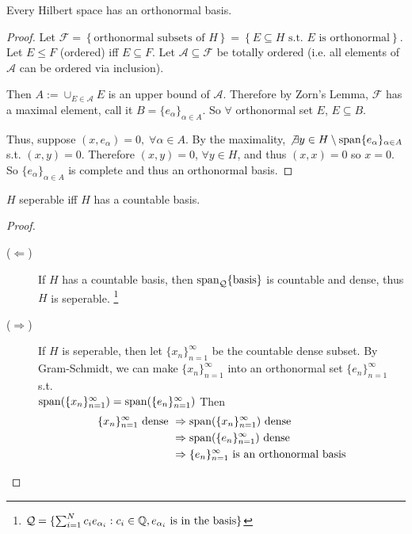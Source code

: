 \begin{thm}
    Every Hilbert space has an orthonormal basis.
\end{thm}
\begin{proof}
    Let $\mathcal{F} = \left\{ \text{orthonormal subsets of } H \right\} = \left\{ E \subseteq H 
    \text{ s.t. } E \text{ is orthonormal} \right\} $.
    Let $E \leq F$ (ordered) iff $E \subseteq F$. Let $\mathcal{A} \subseteq \mathcal{F}$
    be totally ordered (i.e. all elements of $\mathcal{A}$ can be ordered via inclusion).

    Then $A := \cup_{E \in \mathcal{A}} E$ is an upper bound of $\mathcal{A}$.
    Therefore by Zorn's Lemma, $\mathcal{F}$ has a maximal element, call it 
    $B = \{ e_\alpha \}_{\alpha \in A}$. So $\forall $ orthonormal set $E$, $E \subseteq B$.
    
    Thus, suppose $(x, e_\alpha) = 0, \; \forall \alpha \in A$. By the maximality,
    $ \not{\exists} y \in H \setminus \operatorname{span} \{e_\alpha\}_{\alpha \in A} $ s.t. 
    $(x, y) = 0$. Therefore $(x, y) = 0 $, $\forall y \in H$, and thus $(x, x) = 0$ so $x = 0$.
    So $\{e_\alpha\}_{\alpha \in A}$ is complete and thus an orthonormal basis. \qedhere     

\end{proof}

\begin{prop}
    $H$ seperable iff $H$ has a countable basis. 
\end{prop}
\begin{proof} \leavevmode
    \begin{description}
         \item[($\Leftarrow$)] If $H$ has a countable basis, then $\operatorname{span}_\mathcal{Q} \{ \text{basis} \}$
         is countable and dense, thus $H$ is seperable.
         \footnote{$\mathcal{Q} = \{ \sum_{i = 1}^N c_i e_{\alpha_i} : c_i \in \mathbb{Q}, e_{\alpha_i} \text{ is in the basis}\}$  }    
        \item[($\Rightarrow$)]  If $H$ is seperable, then let $\{x_{n}\}_{n=1}^{\infty} $ be the
        countable dense subset. By Gram-Schmidt, we can make $\{x_n\}_{n = 1}^\infty$ into an orthonormal 
        set $\{e_n\}_{n = 1}^\infty$ s.t. \\
        $
        \operatorname{span} (\{x_{n}\}_{n=1}^{\infty} ) = \operatorname{span} (\{e_{n}\}_{n=1}^{\infty} )
        $
        Then
        \begin{align*}
            \{x_{n}\}_{n=1}^{\infty} \text{ dense } &\Rightarrow \operatorname{span}(\{x_{n}\}_{n=1}^{\infty} ) \text{ dense } \\
            &\Rightarrow \operatorname{span}(\{e_{n}\}_{n=1}^{\infty} ) \text{ dense } \\
            &\Rightarrow \{e_n\}_{n = 1}^\infty \text{ is an orthonormal basis} \qedhere
        \end{align*}
    \end{description}
\end{proof}


